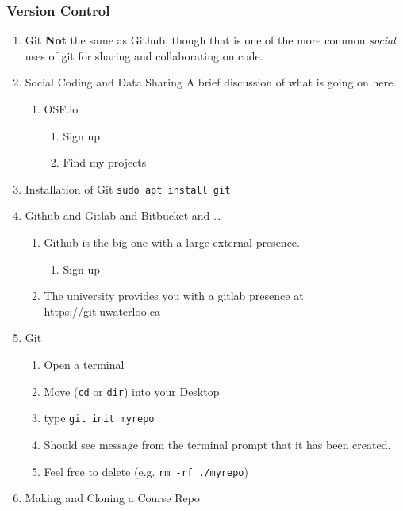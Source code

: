 \documentclass{article}
\begin{document}
\subsubsection{Version Control}
\label{sec:org709dec0}
\begin{enumerate}
\item Git
\label{sec:org7b478ab}
\textbf{\textbf{Not}} the same as Github, though that is one of the more common \emph{social} uses of git for sharing and collaborating on code. 
\item Social Coding and Data Sharing
\label{sec:org4a4da1b}
A brief discussion of what is going on here.
\begin{enumerate}
\item OSF.io
\label{sec:org7dc69c2}
\begin{enumerate}
\item Sign up
\item Find my projects
\end{enumerate}
\end{enumerate}
\item Installation of Git
\label{sec:org267822b}
\texttt{sudo apt install git}
\item Github and Gitlab and Bitbucket and \ldots{}
\label{sec:org4b0e55b}
\begin{enumerate}
\item Github is the big one with a large external presence.
\begin{enumerate}
\item Sign-up
\end{enumerate}
\item The university provides you with a gitlab presence at \url{https://git.uwaterloo.ca}
\end{enumerate}
\item Git
\label{sec:org054551a}
\begin{enumerate}
\item Open a terminal
\item Move (\texttt{cd} or \texttt{dir}) into your Desktop
\item type \texttt{git init myrepo}
\item Should see message from the terminal prompt that it has been created.
\item Feel free to delete (e.g. \texttt{rm -rf ./myrepo})
\end{enumerate}
\item Making and Cloning a Course Repo
\label{sec:org4c87db9}
\begin{enumerate}

\end{enumerate}
\end{enumerate}
\end{document}
